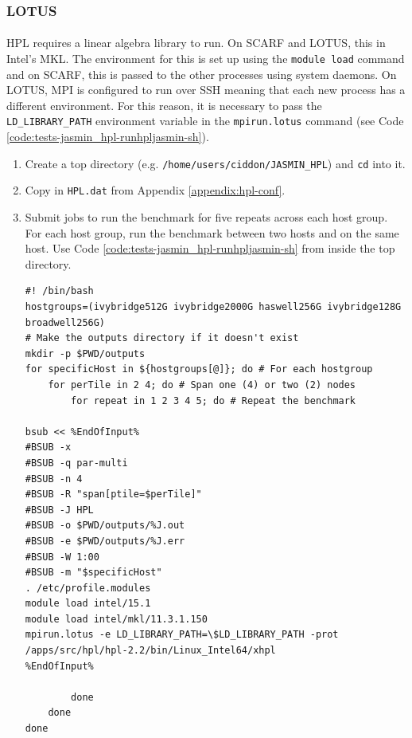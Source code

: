 \documentclass{article}
\newenvironment{code}{\captionsetup{type=listing}}{}
\begin{document}
        \subsubsection{LOTUS}

        \paragraph{}
        HPL requires a linear algebra library to run. On SCARF and LOTUS, this in Intel's MKL. The environment for this is set up using the \texttt{module load} command and on SCARF, this is passed to the other processes using system daemons. On LOTUS, MPI is configured to run over SSH meaning that each new process has a different environment. For this reason, it is necessary to pass the \verb|LD_LIBRARY_PATH| environment variable in the \texttt{mpirun.lotus} command (see Code \ref{code:tests-jasmin_hpl-runhpljasmin-sh}).

        \begin{enumerate}

            \item Create a top directory (e.g. \verb|/home/users/ciddon/JASMIN_HPL|) and \verb|cd| into it.

            \item Copy in \verb|HPL.dat| from Appendix \ref{appendix:hpl-conf}.

            \item Submit jobs to run the benchmark for five repeats across each host group. For each host group, run the benchmark between two hosts and on the same host. Use Code \ref{code:tests-jasmin_hpl-runhpljasmin-sh} from inside the top directory.

            \begin{code}
            \label{code:tests-jasmin_hpl-runhpljasmin-sh}

            \begin{verbatim}
#! /bin/bash
hostgroups=(ivybridge512G ivybridge2000G haswell256G ivybridge128G broadwell256G)
# Make the outputs directory if it doesn't exist
mkdir -p $PWD/outputs
for specificHost in ${hostgroups[@]}; do # For each hostgroup
    for perTile in 2 4; do # Span one (4) or two (2) nodes
        for repeat in 1 2 3 4 5; do # Repeat the benchmark

bsub << %EndOfInput%
#BSUB -x
#BSUB -q par-multi
#BSUB -n 4
#BSUB -R "span[ptile=$perTile]"
#BSUB -J HPL
#BSUB -o $PWD/outputs/%J.out
#BSUB -e $PWD/outputs/%J.err
#BSUB -W 1:00
#BSUB -m "$specificHost"
. /etc/profile.modules
module load intel/15.1
module load intel/mkl/11.3.1.150
mpirun.lotus -e LD_LIBRARY_PATH=\$LD_LIBRARY_PATH -prot /apps/src/hpl/hpl-2.2/bin/Linux_Intel64/xhpl
%EndOfInput%

        done
    done
done
            \end{verbatim}
            \end{code}
        \end{enumerate}
\end{document}
